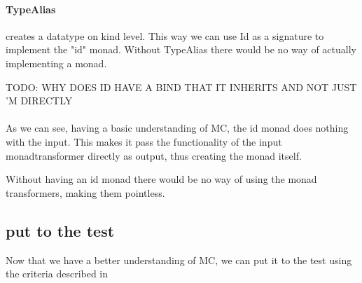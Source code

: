 \paragraph{TypeAlias} creates a datatype on kind level.
This way we can use Id as a signature to implement the "id" monad.
Without TypeAlias there would be no way of actually implementing a monad.

TODO: WHY DOES ID HAVE A BIND THAT IT INHERITS AND NOT JUST 'M DIRECTLY

\paragraph{} As we can see, having a basic understanding of MC, the id monad does nothing with the input.
This makes it pass the functionality of the input monadtransformer directly as output, thus creating the monad itself.

Without having an id monad there would be no way of using the monad transformers, making them pointless.


\subsection{put to the test}
Now that we have a better understanding of MC, we can put it to the test using the criteria described in \cite{sectionstuff}

